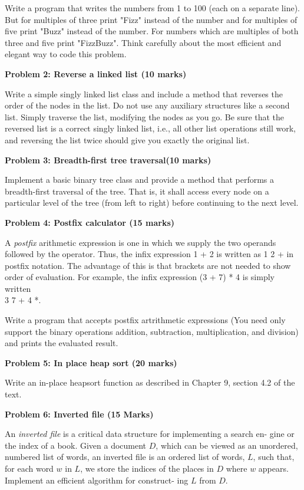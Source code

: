 \documentclass{article}
\begin{document}
Write a program that writes the numbers from 1 to 100 (each on a separate line). But for
multiples of three print "Fizz" instead of the number and for multiples of five print "Buzz" instead of
the number. For numbers which are multiples of both three and five print "FizzBuzz". Think carefully
about the most efficient and elegant way to code this problem.

\textbf{Problem 2: Reverse a linked list (10 marks)}

Write a simple singly linked list class and include a method that reverses the order of the nodes in the list. Do not use any auxiliary structures like a second list.  Simply traverse the list, modifying the nodes as you go. Be sure that the reversed list is a correct singly linked list, i.e., all other list operations still work, and reversing the list twice should give you exactly the original list. 

\newpage

\textbf{Problem 3: Breadth-first tree traversal(10 marks)}

Implement a basic binary tree class and provide a method that performs a breadth-first traversal of the tree. That is, it shall access every node on a particular level of the tree (from left to right) before continuing to the next level.


\textbf{Problem 4: Postfix calculator (15 marks)}

A \emph{postfix} arithmetic expression is one in which we supply the two operands followed by the operator.  Thus, the infix expression 1 + 2 is written as 1 2 + in postfix notation. The advantage of this is that brackets are not needed to show order of evaluation.  For example, the infix expression (3 + 7) * 4 is simply written \\ 3 7 + 4 *.

Write a program that accepts postfix artrithmetic expressions (You need only support the binary operations addition, subtraction, multiplication, and division) and prints the evaluated result.


\textbf{Problem 5: In place heap sort (20 marks)}

Write an in-place heapsort function as described in Chapter 9, section 4.2 of the text.

\textbf{Problem 6: Inverted file (15 Marks)}

An \emph{inverted file} is a critical data structure for implementing a search en-
gine or the index of a book. Given a document $D$, which can be viewed
as an unordered, numbered list of words, an inverted file is an ordered list
of words, $L$, such that, for each word $w$ in $L$, we store the indices of the
places in $D$ where $w$ appears. Implement an efficient algorithm for construct-
ing $L$ from $D$.
\end{document}
